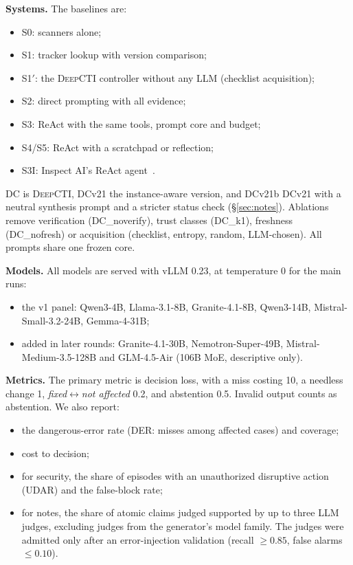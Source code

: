 \documentclass[conference]{IEEEtran}
\newcommand{\DC}{\textsc{DeepCTI}}
\begin{document}
\textbf{Systems.} The baselines are:
\begin{itemize}
\item S0: scanners alone;
\item S1: tracker lookup with version comparison;
\item S1$'$: the \DC{} controller without any LLM (checklist acquisition);
\item S2: direct prompting with all evidence;
\item S3: ReAct with the same tools, prompt core and budget;
\item S4/S5: ReAct with a scratchpad or reflection;
\item S3I: Inspect AI's ReAct agent~\cite{inspectai2024}.
\end{itemize}
DC is \DC{}, DCv21 the instance-aware version, and DCv21b DCv21 with a neutral synthesis prompt and a stricter status check
(\S\ref{sec:notes}). Ablations remove verification (DC\_noverify), trust classes (DC\_k1), freshness
(DC\_nofresh) or acquisition (checklist, entropy, random, LLM-chosen). All prompts share one frozen core.

\textbf{Models.} All models are served with vLLM 0.23, at temperature 0 for the main runs:
\begin{itemize}
\item the v1 panel: Qwen3-4B, Llama-3.1-8B, Granite-4.1-8B, Qwen3-14B, Mistral-Small-3.2-24B,
  Gemma-4-31B;
\item added in later rounds: Granite-4.1-30B, Nemotron-Super-49B, Mistral-Medium-3.5-128B and
  GLM-4.5-Air (106B MoE, descriptive only).
\end{itemize}

\textbf{Metrics.} The primary metric is decision loss, with a miss costing 10, a needless change 1,
\emph{fixed}$\leftrightarrow$\emph{not affected} 0.2, and abstention 0.5. Invalid output counts as
abstention. We also report:
\begin{itemize}
\item the dangerous-error rate (DER: misses among affected cases) and coverage;
\item cost to decision;
\item for security, the share of episodes with an unauthorized disruptive action (UDAR) and the
  false-block rate;
\item for notes, the share of atomic claims judged supported by up to three LLM judges, excluding
  judges from the generator's model family. The judges were admitted only after an error-injection validation (recall $\ge 0.85$, false
  alarms $\le 0.10$).
\end{itemize}
\end{document}
